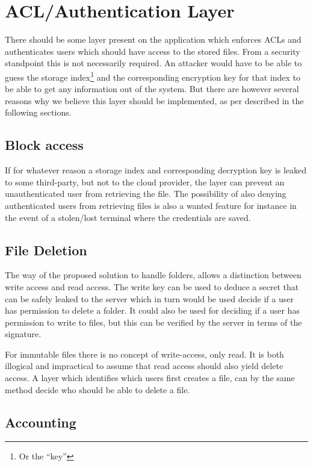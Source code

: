 \documentclass[pdftex,english,10pt,b5paper,twoside]{book}
\begin{document}


\section{ACL/Authentication Layer}

There should be some layer present on the application which enforces \ac{ACL}s
and authenticates users which should have access to the stored files. From a
security standpoint this is not necessarily required. An attacker would have to
be able to guess the storage index\footnote{Or the ``key''} and the
corresponding encryption key for that index to be able to get any information
out of the system. But there are however several reasons why we believe this
layer should be implemented, as per described in the following sections.

\subsection{Block access}
If for whatever reason a storage index and corresponding decryption key is
leaked to some third-party, but not to the cloud provider, the layer can
prevent an unauthenticated user from retrieving the file. The possibility of
also denying authenticated users from retrieving files is also a wanted feature
for instance in the event of a stolen/lost terminal where the credentials are
saved.

\subsection{File Deletion}

The way of the proposed solution to handle folders, allows a distinction between write
access and read access. The write key can be used to deduce a secret that can
be safely leaked to the server which in turn would be used decide if a user has
permission to delete a folder. It could also be used for deciding if a user has
permission to write to files, but this can be verified by the server in terms
of the signature.

For immutable files there is no concept of write-access, only read. It is both
illogical and impractical to assume that read access should also yield
delete access. A layer which identifies which users first creates a file, can by
the same method decide who should be able to delete a file. 

\subsection{Accounting}
\end{document}
